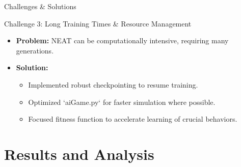 \documentclass{beamer}
\begin{document}
\begin{frame}{Challenges \& Solutions}
    \begin{block}{Challenge 3: Long Training Times \& Resource Management}
        \begin{itemize}
            \item \textbf{Problem:} NEAT can be computationally intensive, requiring many generations.
            \item \textbf{Solution:}
                \begin{itemize}
                    \item Implemented robust checkpointing to resume training.
                    \item Optimized `aiGame.py` for faster simulation where possible.
                    \item Focused fitness function to accelerate learning of crucial behaviors.
                \end{itemize}
        \end{itemize}
    \end{block}
\end{frame}

\section{Results and Analysis}
\end{document}
